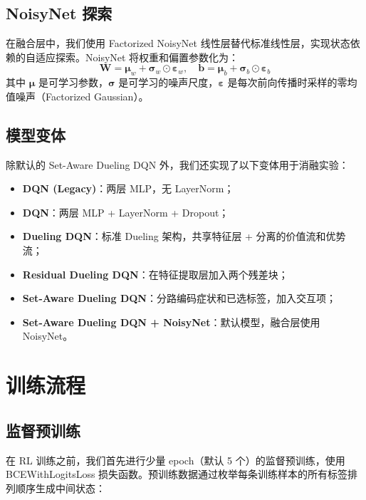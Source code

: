 \documentclass[12pt,a4paper]{article}
\begin{document}
\subsection{NoisyNet 探索}

在融合层中，我们使用 Factorized NoisyNet 线性层替代标准线性层，实现状态依赖的自适应探索。NoisyNet 将权重和偏置参数化为：
\begin{equation}
    \mathbf{W} = \boldsymbol{\mu}_w + \boldsymbol{\sigma}_w \odot \boldsymbol{\varepsilon}_w, \quad \mathbf{b} = \boldsymbol{\mu}_b + \boldsymbol{\sigma}_b \odot \boldsymbol{\varepsilon}_b
\end{equation}
其中 $\boldsymbol{\mu}$ 是可学习参数，$\boldsymbol{\sigma}$ 是可学习的噪声尺度，$\boldsymbol{\varepsilon}$ 是每次前向传播时采样的零均值噪声（Factorized Gaussian）。

\subsection{模型变体}

除默认的 Set-Aware Dueling DQN 外，我们还实现了以下变体用于消融实验：
\begin{itemize}
    \item \textbf{DQN (Legacy)}：两层 MLP，无 LayerNorm；
    \item \textbf{DQN}：两层 MLP + LayerNorm + Dropout；
    \item \textbf{Dueling DQN}：标准 Dueling 架构，共享特征层 + 分离的价值流和优势流；
    \item \textbf{Residual Dueling DQN}：在特征提取层加入两个残差块；
    \item \textbf{Set-Aware Dueling DQN}：分路编码症状和已选标签，加入交互项；
    \item \textbf{Set-Aware Dueling DQN + NoisyNet}：默认模型，融合层使用 NoisyNet。
\end{itemize}

\section{训练流程}

\subsection{监督预训练}

在 RL 训练之前，我们首先进行少量 epoch（默认 5 个）的监督预训练，使用 BCEWithLogitsLoss 损失函数。预训练数据通过枚举每条训练样本的所有标签排列顺序生成中间状态：
\end{document}
